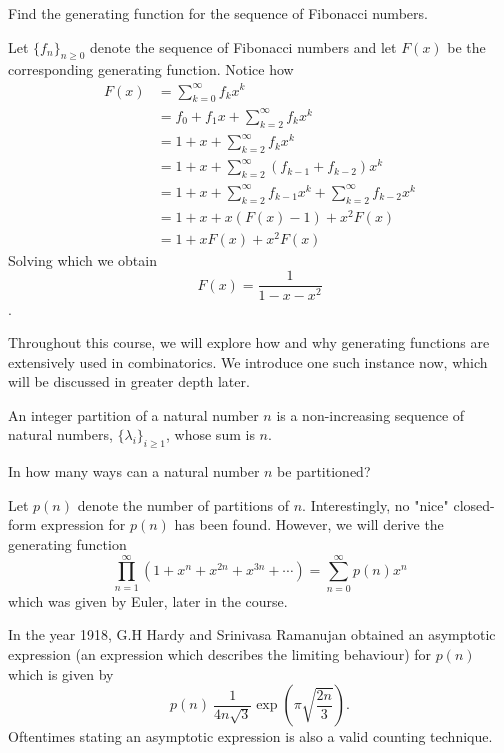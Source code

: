 \begin{question}
	Find the generating function for the sequence of Fibonacci numbers. 
 \label{q:1.9}
\end{question}
\begin{solution}
Let $\{f_{n}\}_{n \ge 0}$ denote the sequence of Fibonacci numbers and let $F\left( x \right)$ be the corresponding generating function. Notice how 
\begin{align*}
	F\left( x \right) &= \sum_{k=0}^{\infty} f_{k}x^k \\
	&= f_{0}+f_{1}x+\sum_{k=2}^{\infty}f_{k}x^k \\
	&= 1+x+\sum_{k=2}^{\infty}f_{k}x^k \\
	&= 1+x+\sum_{k=2}^\infty \left( f_{k-1}+f_{k-2} \right) x^k \\
	&= 1+x+\sum_{k=2}^{\infty} f_{k-1}x^k + \sum_{k=2}^{\infty} f_{k-2}x^k \\
	&= 1+x+x\left( F\left( x \right) -1 \right) + x^2F\left( x \right)  \\
	&= 1+xF\left( x \right)+x^2F\left( x \right)
\end{align*}
Solving which we obtain \[
F\left( x \right) = \frac{1}{1-x-x^2}
\].
\end{solution}
Throughout this course, we will explore how and why generating functions are extensively used in combinatorics. We introduce one such instance now, which will be discussed in greater depth later.
\begin{definition}
An integer partition of a natural number $n$ is a non-increasing sequence of natural numbers, $\{\lambda_i\}_{i \ge 1}$, whose sum is $n$.
\label{d:1.5}
\end{definition}
\begin{question}
In how many ways can a natural number $n$ be partitioned?
\end{question}
Let $p(n)$ denote the number of partitions of $n$. Interestingly, no "nice" closed-form expression for $p(n)$ has been found. However, we will derive the generating function \[
	\prod_{n=1}^\infty\left( 1+x^n +x^{2n}+x^{3n}+\cdots\right) =  \sum_{n=0}^{\infty}p\left( n \right) x^n
\] which was given by Euler, later in the course.
\begin{remark}
In the year 1918, G.H Hardy and Srinivasa Ramanujan obtained an asymptotic expression (an expression which describes the limiting behaviour) for $p\left( n \right)$ which is given by \[
p\left( n \right) ~ \frac{1}{4n\sqrt{3}}\exp\left( \pi \sqrt{\frac{2n}{3}}  \right) .\] Oftentimes stating an asymptotic expression is also a valid counting technique.
\label{r:1.3}
\end{remark}
